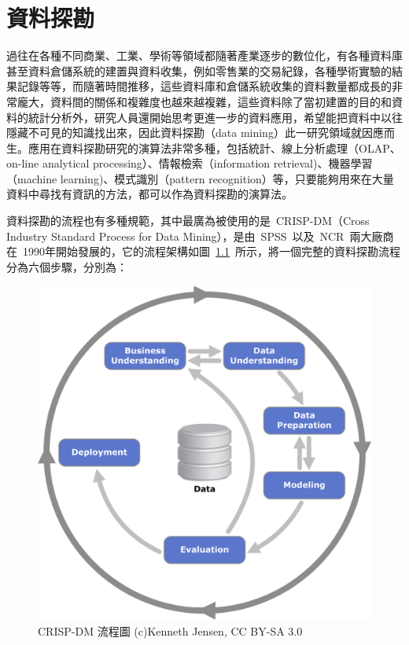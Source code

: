 \renewcommand\thetable{\arabic{chapter}-\arabic{table}}
\renewcommand{\theequation}{\arabic{chapter}-\arabic{equation}}
\chapter{資料探勘}

過往在各種不同商業、工業、學術等領域都隨著產業逐步的數位化，有各種資料庫甚至資料倉儲系統的建置與資料收集，例如零售業的交易紀錄，各種學術實驗的結果記錄等等，而隨著時間推移，這些資料庫和倉儲系統收集的資料數量都成長的非常龐大，資料間的關係和複雜度也越來越複雜，這些資料除了當初建置的目的和資料的統計分析外，研究人員還開始思考更進一步的資料應用，希望能把資料中以往隱藏不可見的知識找出來，因此資料探勘（data mining）此一研究領域就因應而生。應用在資料探勘研究的演算法非常多種，包括統計、線上分析處理（OLAP、on-line analytical processing）、情報檢索（information retrieval)、機器學習（machine learning)、模式識別（pattern recognition）等，只要能夠用來在大量資料中尋找有資訊的方法，都可以作為資料探勘的演算法。

資料探勘的流程也有多種規範，其中最廣為被使用的是~CRISP-DM\cite{shearer2000crisp}（Cross Industry Standard Process for Data Mining），是由~SPSS~以及~NCR~兩大廠商在~1990年開始發展的，它的流程架構如圖~\ref{fig:CRISP-DM}~所示，將一個完整的資料探勘流程分為六個步驟，分別為：

\begin{figure}[hbtp]
  \begin{center}
    \includegraphics[width=1.0\textwidth]{figures/1196px-CRISP-DM_Process_Diagram.png}
    \caption{CRISP-DM 流程圖 (c)Kenneth Jensen, CC BY-SA 3.0} 
    \label{fig:CRISP-DM}
  \end{center}
\end{figure}

